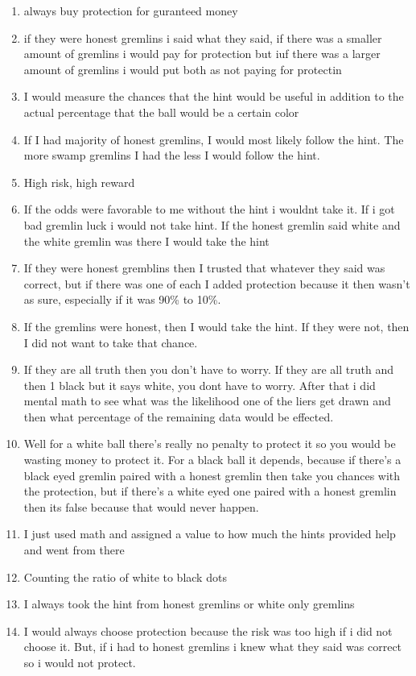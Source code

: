 \documentclass[12pt,a4paper]{article}
\begin{document}
\begin{appendices}
\begin{enumerate}
\item always buy protection for guranteed money
\item if they were honest gremlins i said what they said, if there was a smaller amount of gremlins i would pay for protection but iuf there was a larger amount of gremlins i would put both as not paying for protectin
\item I would measure the chances that the hint would be useful in addition to the actual percentage that the ball would be a certain color
\item If I had majority of honest gremlins, I would most likely follow the hint. The more swamp gremlins I had the less I would follow the hint.
\item High risk, high reward 
\item If the odds were favorable to me without the hint i wouldnt take it. If i got bad gremlin luck i would not take hint. If the honest gremlin said white and the white gremlin was there I would take the hint
\item If they were honest gremblins then I trusted that whatever they said was correct, but if there was one of each I added protection because it then wasn't as sure, especially if it was 90\% to 10\%. 
\item If the gremlins were honest, then I would take the hint. If they were not, then I did not want to take that chance.
\item If they are all truth then you don't have to worry. If they are all truth and then 1 black but it says white, you dont have to worry. After that i did mental math to see what was the likelihood one of the liers get drawn and then what percentage of the remaining data would be effected. 
\item Well for a white ball there's really no penalty to protect it so you would be wasting money to protect it. For a black ball it depends, because if there's a black eyed gremlin paired with a honest gremlin then take you chances with the protection, but if there's a white eyed one paired with a honest gremlin then its false because that would never happen. 
\item I just used math and assigned a value to how much the hints provided help and went from there
\item Counting the ratio of white to black dots
\item I always took the hint from honest gremlins or white only gremlins
\item I would always choose protection because the risk was too high if i did not choose it. But, if i had to honest gremlins i knew what they said was correct so i would not protect.

\end{enumerate}
\end{appendices}
\end{document}
